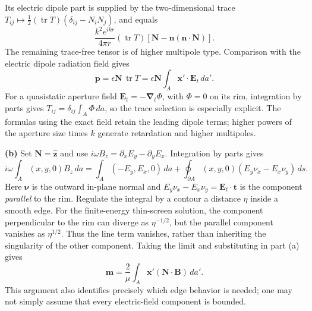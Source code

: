 Its electric dipole part is supplied by the two-dimensional trace
$T_{ij}\mapsto\tfrac12(\operatorname{tr}T)
(\delta_{ij}-N_iN_j)$, and equals
\[
\frac{k^2e^{ikr}}{4\pi r}(\operatorname{tr}T)
[\mathbf N-\mathbf n(\mathbf n\cdot\mathbf N)].
\]
The remaining trace-free tensor is of higher multipole type.
Comparison with the electric dipole radiation field gives
\[
\boxed{\mathbf p=\epsilon\mathbf N\,\operatorname{tr}T
=\epsilon\mathbf N\int_A\mathbf x'\cdot\mathbf E_t\,da'.}
\]
For a quasistatic aperture field $\mathbf E_t=-\boldsymbol\nabla_t\Phi$,
with $\Phi=0$ on its rim, integration by parts gives
$T_{ij}=\delta_{ij}\int_A\Phi\,da$, so the trace selection is especially
explicit. The formulas using the exact field retain the leading dipole
terms; higher powers of the aperture size times $k$ generate retardation
and higher multipoles.

\textbf{(b)} Set $\mathbf N=\widehat{\mathbf z}$ and use
$i\omega B_z=\partial_xE_y-\partial_yE_x$. Integration by parts gives
\[
i\omega\int_A(x,y,0)B_z\,da
=\int_A(-E_y,E_x,0)\,da+
\oint_{\partial A}(x,y,0)(E_y\nu_x-E_x\nu_y)\,ds .
\]
Here $\boldsymbol\nu$ is the outward in-plane normal and
$E_y\nu_x-E_x\nu_y=\mathbf E_t\cdot\mathbf t$ is the component
\emph{parallel} to the rim. Regulate the integral by a contour a distance
$\eta$ inside a smooth edge. For the finite-energy thin-screen solution,
the component perpendicular to the rim can diverge as $\eta^{-1/2}$,
but the parallel component vanishes as $\eta^{1/2}$. Thus the line term
vanishes, rather than inheriting the singularity of the other component.
Taking the limit and substituting in part (a) gives
\[
\boxed{\mathbf m=\frac2\mu\int_A\mathbf x'
(\mathbf N\cdot\mathbf B)\,da'.}
\]
This argument also identifies precisely which edge behavior is needed;
one may not simply assume that every electric-field component is bounded.

